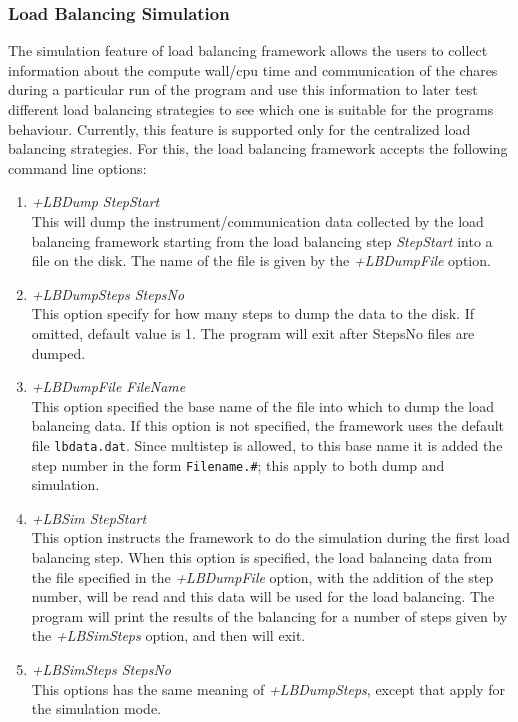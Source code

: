 \subsubsection{Load Balancing Simulation}
The simulation feature of load balancing framework allows the users to collect information
about the compute wall/cpu time and communication of the chares during a particular run of
the program and use this information to later test different load balancing strategies to
see which one is suitable for the programs behaviour. Currently, this feature is supported only for
the centralized load balancing strategies. For this, the load balancing framework
accepts the following command line options:
\begin{enumerate}
\item {\em +LBDump StepStart}\\
        This will dump the instrument/communication data collected by the load balancing framework
	starting from the load balancing step {\em StepStart} into a file on the disk. The name of the file
	is given by the {\em +LBDumpFile} option.
\item {\em +LBDumpSteps StepsNo}\\
        This option specify for how many steps to dump the data to the disk. If omitted, default value is 1.
	The program will exit after StepsNo files are dumped.
\item {\em +LBDumpFile FileName}\\
	This option specified the base name of the file into which to dump the load balancing data. If this
	option is not specified, the framework uses the default file {\tt lbdata.dat}. Since multistep is allowed,
	to this base name it is added the step number in the form {\tt Filename.\#}; this apply to both dump and
	simulation.
\item {\em +LBSim StepStart}\\
	This option instructs the framework to do the simulation during the first load balancing step.
	When this option is specified, the load balancing data from the file specified in the {\em +LBDumpFile}
	option, with the addition of the step number, will be read and this data
	will be used for the load balancing. The program will print the results
	of the balancing for a number of steps given by the {\em +LBSimSteps} option, and then will exit.
\item {\em +LBSimSteps StepsNo}\\
        This options has the same meaning of {\em +LBDumpSteps}, except that apply for the simulation mode.

\end{enumerate}
